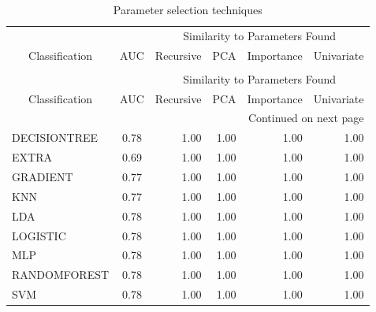 \documentclass[letterpaper]{article}
\begin{document}
{%

\begin{tiny}

\begin{longtable}{lcrrrr}
\caption[short caption]{Parameter selection techniques - LBP}
\label{table:matches-selection}\\
\toprule
& & \multicolumn{4}{c}{Similarity to Parameters Found}\\
\cmidrule{3-6} 
\multicolumn{1}{c}{Classification} & \multicolumn{1}{c}{AUC} & \multicolumn{1}{c}{Recursive} &  \multicolumn{1}{c}{PCA} & \multicolumn{1}{c}{Importance} & \multicolumn{1}{c}{Univariate} \\
\midrule
\endfirsthead
\caption[]{Parameter selection techniques} \\
\toprule
& & \multicolumn{4}{c}{Similarity to Parameters Found}\\
\cmidrule{3-6} 
\multicolumn{1}{c}{Classification} & \multicolumn{1}{c}{AUC} & \multicolumn{1}{c}{Recursive} &  \multicolumn{1}{c}{PCA} & \multicolumn{1}{c}{Importance} & \multicolumn{1}{c}{Univariate} \\
\midrule
\endhead
\midrule
\multicolumn{6}{r}{{Continued on next page}} \\
\midrule
\endfoot

\bottomrule
\endlastfoot
DECISIONTREE & 0.78 &      1.00 & 1.00 &       1.00 &       1.00 \\
       EXTRA & 0.69 &      1.00 & 1.00 &       1.00 &       1.00 \\
    GRADIENT & 0.77 &      1.00 & 1.00 &       1.00 &       1.00 \\
         KNN & 0.77 &      1.00 & 1.00 &       1.00 &       1.00 \\
         LDA & 0.78 &      1.00 & 1.00 &       1.00 &       1.00 \\
    LOGISTIC & 0.78 &      1.00 & 1.00 &       1.00 &       1.00 \\
         MLP & 0.78 &      1.00 & 1.00 &       1.00 &       1.00 \\
RANDOMFOREST & 0.78 &      1.00 & 1.00 &       1.00 &       1.00 \\
         SVM & 0.78 &      1.00 & 1.00 &       1.00 &       1.00 \\
\end{longtable}



\end{tiny}}
\end{document}
